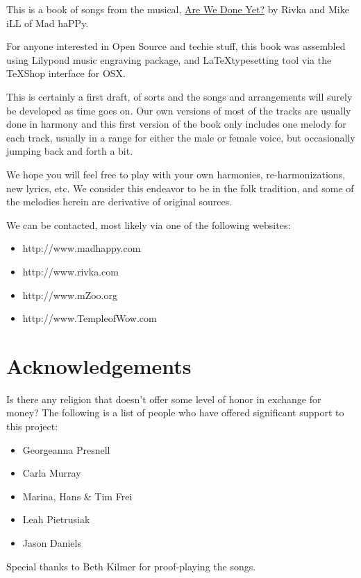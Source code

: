 \documentclass[a5paper,twoside,9pt]{extbook}
\newtheorem{I Surrender}{Definition}
\begin{document}
This is a book of songs from the musical, \underline{Are We Done Yet?} by Rivka and Mike iLL of Mad haPPy.

For anyone interested in Open Source and techie stuff, this book was assembled using Lilypond music engraving package, and \LaTeX  typesetting tool via the TeXShop interface for OSX.

This is certainly a first draft, of sorts and the songs and arrangements will surely be developed as time goes on. Our own versions of most of the tracks are usually done in harmony and this first version of the book only includes one melody for each track, usually in a range for either the male or female voice, but occasionally jumping back and forth a bit.

We hope you will feel free to play with your own harmonies, re-harmonizations, new lyrics, etc. We consider this endeavor to be in the folk tradition, and some of the melodies herein are derivative of original sources.

We can be contacted, most likely via one of the following websites: \\
\begin{itemize}
\item http://www.madhappy.com 
\item http://www.rivka.com
\item http://www.mZoo.org
\item http://www.TempleofWow.com
\end{itemize}
\pagebreak{}

\section{Acknowledgements}

Is there any religion that doesn't offer some level of honor in exchange for money?
\newline
The following is a list of people who have offered significant support to this project:
  
\begin{itemize}   
  \item Georgeanna Presnell
  \item Carla Murray
  \item Marina, Hans \& Tim Frei
  \item Leah Pietrusiak
  \item Jason Daniels
\end{itemize}    

  
  Special thanks to Beth Kilmer for proof-playing the songs.
   \newline
   
\end{document}
